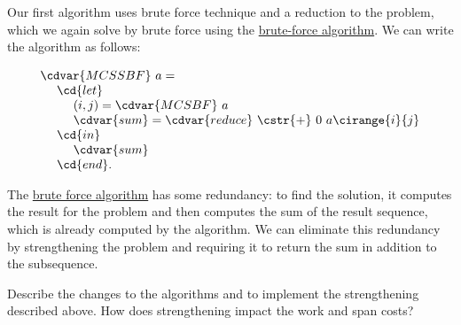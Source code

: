 \begin{cluster}
\label{grp:alg:mcss::bf-alg::mcss}

\begin{algorithm}
\label{alg:mcss::bf-alg::mcss}

Our first algorithm uses brute force technique and a reduction to the
\MCS{} problem, which we again solve by brute force using the
\href{alg:mcss::bf-alg::mcs}{brute-force \MCS{} algorithm}.
We can write the algorithm as follows:

\[
\begin{array}{l}
\cdvar{MCSSBF}~a =
\\
~~~~\cd{let} 
\\
~~~~~~~~(i, j) =  \cdvar{MCSBF}~a
\\
~~~~~~~~\cdvar{sum} = \cdvar{reduce}~\cstr{+}~0~a\cirange{i}{j}
\\
~~~~\cd{in}
\\
~~~~~~~~\cdvar{sum}
\\
~~~~\cd{end}.
\end{array}
\]

\end{algorithm}
\end{cluster}

\begin{cluster}
\label{grp:grm:mcss::strengthening}

\begin{gram}[Strengthening]
\label{grm:mcss::strengthening}
The \href{alg:mcss::bf-alg::mcss}{brute force algorithm} 
has some redundancy: to find the solution, it computes the result for
the \MCS{} problem and then computes the sum of the result sequence,
which is already computed by the \MCS{} algorithm.
We can eliminate this redundancy by strengthening the \MCS{} problem
and requiring it to return the sum in addition to the subsequence.

\end{gram}
\end{cluster}

\begin{cluster}
\label{grp:xrcs:mcss::describe}

\begin{exercise}
\label{xrcs:mcss::describe}
Describe the changes to the algorithms 
 and 
to implement the strengthening described above.
How does strengthening impact the work and span costs?

\end{exercise}
\end{cluster}

